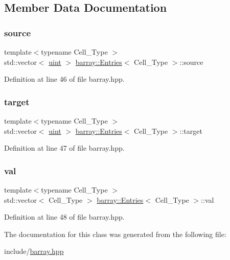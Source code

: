 \subsection{Member Data Documentation}
\mbox{\label{classbarray_1_1_entries_ab8d603d5371b5c5f354d7a4208771a9a}} 
\subsubsection{\texorpdfstring{source}{source}}
{\footnotesize\ttfamily template$<$typename Cell\+\_\+\+Type $>$ \\
std\+::vector$<$ \hyperlink{namespacebarray_af9756a31953db233f80a9cfe1ef31c32}{uint} $>$ \hyperlink{classbarray_1_1_entries}{barray\+::\+Entries}$<$ Cell\+\_\+\+Type $>$\+::source}



Definition at line 46 of file barray.\+hpp.

\mbox{\label{classbarray_1_1_entries_a6ee07a19fe9412417b6b2394689dd0dc}} 
\subsubsection{\texorpdfstring{target}{target}}
{\footnotesize\ttfamily template$<$typename Cell\+\_\+\+Type $>$ \\
std\+::vector$<$ \hyperlink{namespacebarray_af9756a31953db233f80a9cfe1ef31c32}{uint} $>$ \hyperlink{classbarray_1_1_entries}{barray\+::\+Entries}$<$ Cell\+\_\+\+Type $>$\+::target}



Definition at line 47 of file barray.\+hpp.

\mbox{\label{classbarray_1_1_entries_a76c7dfbfe4c427a061b30155c6f65b47}} 
\subsubsection{\texorpdfstring{val}{val}}
{\footnotesize\ttfamily template$<$typename Cell\+\_\+\+Type $>$ \\
std\+::vector$<$ Cell\+\_\+\+Type $>$ \hyperlink{classbarray_1_1_entries}{barray\+::\+Entries}$<$ Cell\+\_\+\+Type $>$\+::val}



Definition at line 48 of file barray.\+hpp.



The documentation for this class was generated from the following file\+:\begin{DoxyCompactItemize}
\item 
include/\hyperlink{barray_8hpp}{barray.\+hpp}\end{DoxyCompactItemize}
